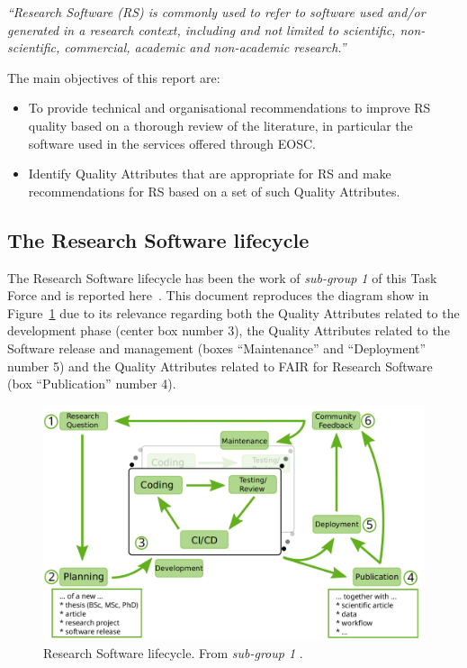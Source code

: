 \textit{``Research Software (RS) is commonly used to refer to software used and/or generated in a research context, including and not limited to scientific, non-scientific, commercial, academic and non-academic research.''}

\label{def_rs}

The main objectives of this report are:

\begin{itemize}
    \item To provide technical and organisational recommendations to improve RS quality based on a thorough review of the literature, in particular the software used in the services offered through EOSC.

    \item Identify Quality Attributes that are appropriate for RS and make recommendations for RS based on a set of such Quality Attributes.

\end{itemize}

\subsection{The Research Software lifecycle}

The Research Software lifecycle has been the work of \textit{sub-group 1} of this Task Force and is reported here~\cite{sg1tf2023}. This document reproduces the diagram show in Figure~\ref{fig:rslifecycle} due to its relevance regarding both the Quality Attributes related to the development phase (center box number 3), the Quality Attributes related to the Software release and management (boxes ``Maintenance'' and ``Deployment'' number 5) and the Quality Attributes related to FAIR for Research Software (box ``Publication'' number 4).

\begin{figure}[h]
    \centering
    \includegraphics[width=0.85\linewidth]{imgs/rs_lifecycle.png}
    \caption{Research Software lifecycle. From \textit{sub-group 1} \cite{sg1tf2023}.}
    \label{fig:rslifecycle}
\end{figure}

